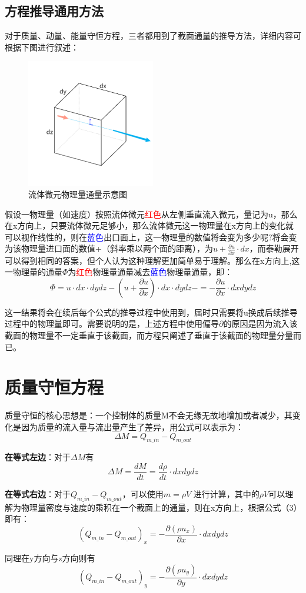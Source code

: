 \documentclass[a4paper,12pt]{article}
\begin{document}
	\subsection{方程推导通用方法}
对于质量、动量、能量守恒方程，三者都用到了截面通量的推导方法，详细内容可根据下图进行叙述：\par
\begin{figure}[htbp]
	\centering
	\includegraphics[width=0.5\textwidth,height=0.5\textwidth]{cube.png}
	\caption{流体微元物理量通量示意图}
	\label{流体微元示意}
\end{figure}\par
假设一物理量（如速度）按照流体微元\textcolor{red}{红色}从左侧垂直流入微元，量记为u，那么在x方向上，只要流体微元足够小，那么流体微元这一物理量在x方向上的变化就可以视作线性的，则在\textcolor{blue}{蓝色}出口面上，这一物理量的数值将会变为多少呢?将会变为该物理量进口面的数值+（斜率乘以两个面的距离），为$u+\frac{\partial u}{\partial x} \cdot dx$，而泰勒展开可以得到相同的答案，但个人认为这种理解更加简单易于理解。那么在x方向上,这一物理量的通量$\Phi$为\textcolor{red}{红色}物理量通量减去\textcolor{blue}{蓝色}物理量通量，即：
		\begin{equation}
		\varPhi=u\cdot dx\cdot dydz-(u+\frac{\partial u}{\partial x} )\cdot dx \cdot dydz-=-\frac{\partial u}{\partial x} \cdot dxdydz
		\end{equation} \par
		这一结果将会在续后每个公式的推导过程中使用到，届时只需要将u换成后续推导过程中的物理量即可。需要说明的是，上述方程中使用偏导$\partial$的原因是因为流入该截面的物理量不一定垂直于该截面，而方程只阐述了垂直于该截面的物理量分量而已。
\section{质量守恒方程}
	质量守恒的核心思想是：一个控制体的质量M不会无缘无故地增加或者减少，其变化是因为质量的流入量与流出量产生了差异，用公式可以表示为：
	\[
	\Delta M=Q_{m\_in}-Q_{m\_out}
	\] \par
	\textbf{在等式左边}：对于$\Delta M$有\[\Delta M=\frac{dM}{dt}=\frac{d\rho}{dt} \cdot dxdydz\] \par
	\textbf{在等式右边}：对于$Q_{m\_in}-Q_{m\_out}$，可以使用$m=\rho V$ 进行计算，其中的$\rho V$可以理解为物理量密度与速度的乘积在一个截面上的通量，则在x方向上，根据公式（3）即有：
	\[
	(Q_{m\_in}-Q_{m\_out})_{x}=-\frac{\partial (\rho u_{x})}{\partial x} \cdot dxdydz
	\] \par
	同理在y方向与z方向则有
	\[
	(Q_{m\_in}-Q_{m\_out})_{y}=-\frac{\partial (\rho u_{y})}{\partial y} \cdot dxdydz
	\]
\end{document}
